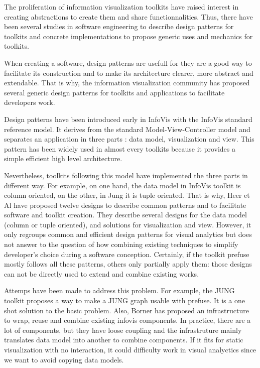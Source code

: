 The proliferation of information visualization toolkits have raised interest
in creating abstractions to create them and share functionnalities. Thus,
there have been several studies in software engineering to describe design
patterns for toolkits and concrete implementations to propose generic uses and
mechanics for toolkits.

When creating a software, design patterns are usefull for they are a good way
to facilitate its construction and to make its architecture clearer,
more abstract and extendable. That is why, the information
visualization community has proposed several generic design patterns
for toolkits and applications to facilitate developers work.

Design patterns have been introduced early in InfoVis with the InfoVis standard
reference model. It derives from the standard Model-View-Controller model and
separates an application in three parts : data model, visualization and view.
This pattern has been widely used in almost every toolkits because it provides
a simple efficient high level architecture. 

Nevertheless, toolkits following this model have implemented the three parts in
different way. For example, on one hand, the data model in InfoVis toolkit is column oriented,
on the other, in Jung it is tuple oriented. That is why, Heer et Al have proposed
twelve designs to describe common patterns and to facilitate software and toolkit
creation. They describe several designs for the data model (column or tuple oriented),
and solutions for visualization and view. However, it only regroups common and efficient design
patterns for visual analytics but does not answer to the question of how combining existing techniques
to simplify developer's choice during a software conception. Certainly,  if the toolkit
prefuse mostly follows all these patterns, others only partially apply them: those designs
can not be directly used to extend and combine existing works.

Attemps have been made to address this problem. For example, the JUNG toolkit proposes
a way to make a JUNG graph usable with prefuse. It is a one shot solution to the basic problem.
Also, Borner has proposed an infrastructure to wrap, reuse and combine existing infovis components.
In practice, there are a lot of components, but they have loose coupling and the infrastruture mainly
translates data model into another to combine components. If it fits for static visualization with
no interaction, it could difficulty work in visual analyctics since we want to avoid copying data
models.

